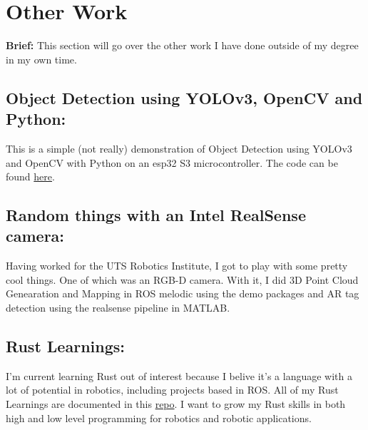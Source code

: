 \newpage
\section{Other Work}
\label{sec:other_work}

\textbf{Brief: } This section will go over the other work I have done outside of my degree in my own time. 

\subsection{Object Detection using YOLOv3, OpenCV and Python:}
This is a simple (not really) demonstration of Object Detection using YOLOv3 and OpenCV with Python on an esp32 S3 microcontroller. The code can be found \href{https://github.com/jackfruittt/simple-object-detection}{here}.


\newpage
\subsection{Random things with an Intel RealSense camera:}

Having worked for the UTS Robotics Institute, I got to play with some pretty cool things. One of which was an RGB-D camera. With it, I did 3D Point Cloud Genearation and Mapping
in ROS melodic using the demo packages and AR tag detection using the realsense pipeline in MATLAB. 


\subsection{Rust Learnings:}

I'm current learning Rust out of interest because I belive it's a language with a lot of potential in robotics, including projects based in ROS. All of my Rust Learnings
are documented in this \href{https://github.com/jackfruittt/rust_learnings}{repo}. I want to grow my Rust skills in both high and low level programming for robotics and robotic
applications.